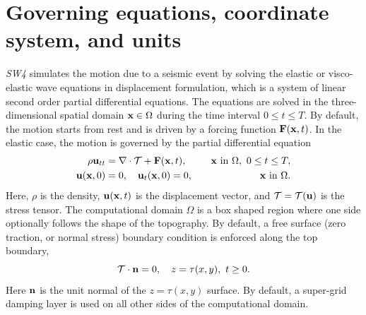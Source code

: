 \documentclass[11pt]{report}
\newcommand{\nb}{{\bf n}}
\begin{document}


\chapter{Governing equations, coordinate system, and units}
%
\emph{SW4} simulates the motion due to a seismic event by solving the elastic or visco-elastic wave
equations in displacement formulation, which is a system of linear second order partial differential
equations. The equations are solved in the three-dimensional spatial domain ${\bf x}\in\Omega$
during the time interval $0\leq t\leq T$. By default, the motion starts from rest and is driven by a
forcing function ${\bf F}({\bf x},t)$. In the elastic case, the motion is governed by the partial
differential equation
\begin{alignat}{3}
\rho {\bf u}_{tt} &= \nabla\cdot{\cal T} + {\bf F}({\bf x},t),&\quad\mbox{${\bf x}$ in
  $\Omega$},\ 0\leq t\leq T,\label{eq:elastic-we}\\ 
{\bf u}({\bf x},0)&=0,\quad {\bf u}_t({\bf x},0) = 0, &\quad\mbox{${\bf x}$ in $\Omega$}.
\end{alignat}
Here, $\rho$ is the density, ${\bf u}({\bf x},t)$ is the displacement vector, and ${\cal T}={\cal
  T}({\bf u})$ is the stress tensor. The computational domain $\Omega$ is a box shaped region where
one side optionally follows the shape of the topography. By default, a free surface (zero traction,
or normal stress) boundary condition is enforced along the top boundary,
\[
{\cal T} \cdot \nb = 0,\quad z=\tau(x,y),\ t\geq 0.
\]
Here $\nb$ is the unit normal of the $z=\tau(x,y)$ surface. By default, a super-grid damping layer
is used on all other sides of the computational domain.
\end{document}
